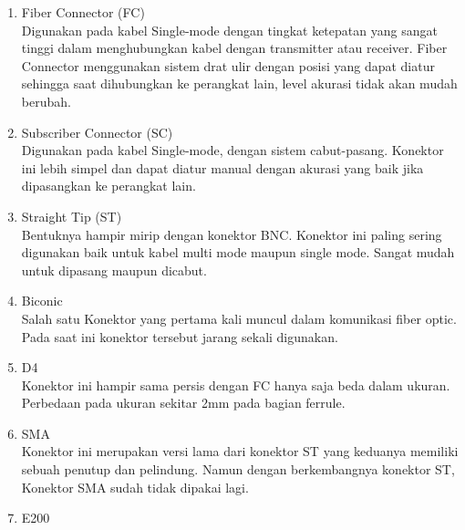 \begin{flushleft}
\begin{enumerate}
\item Fiber Connector (FC) \\ Digunakan pada kabel Single-mode dengan tingkat ketepatan yang sangat tinggi dalam menghubungkan kabel dengan transmitter atau receiver. Fiber Connector menggunakan sistem drat ulir dengan posisi yang dapat diatur sehingga saat dihubungkan ke perangkat lain, level akurasi tidak akan mudah berubah.
\item Subscriber Connector (SC) \\ Digunakan pada kabel Single-mode, dengan sistem cabut-pasang. Konektor ini lebih simpel dan dapat diatur manual dengan akurasi yang baik jika dipasangkan ke perangkat lain.
\item Straight Tip (ST) \\ Bentuknya hampir mirip dengan konektor BNC. Konektor ini paling sering digunakan baik untuk kabel multi mode maupun single mode. Sangat mudah untuk dipasang maupun dicabut.
\item Biconic \\ Salah satu Konektor yang pertama kali muncul dalam komunikasi fiber optic. Pada saat ini konektor tersebut jarang sekali digunakan.
\item D4 \\ Konektor ini hampir sama persis dengan FC hanya saja beda dalam ukuran. Perbedaan pada ukuran sekitar 2mm pada bagian ferrule.
\item SMA \\ Konektor ini merupakan versi lama dari konektor ST yang keduanya memiliki sebuah penutup dan pelindung. Namun dengan berkembangnya konektor ST, Konektor SMA sudah tidak dipakai lagi.
\item E200
\end{enumerate}
\end{flushleft}
